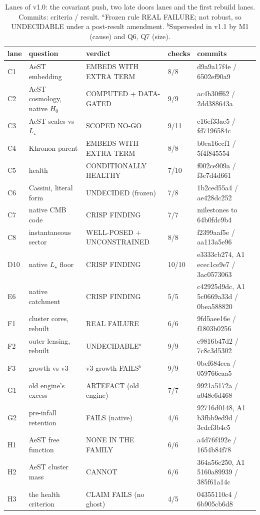 \documentclass[10pt]{article}
\begin{document}
\begin{table}[t]\centering\small
\caption{Lanes of v1.0: the covariant push, two late doors lanes and the first rebuild lanes. Commits: criteria / result. $^a$Frozen rule REAL FAILURE; not robust, so UNDECIDABLE under a post-result amendment. $^b$Superseded in v1.1 by M1 (cause) and Q6, Q7 (size).}\label{tab:lanes}
\begin{tabular}{llllp{}}
\toprule
lane & question & verdict & checks & commits\\
\midrule
C1 & AeST embedding & EMBEDS WITH EXTRA TERM & 8/8 & d9a9a17f4e / 6502ef90a9\\
C2 & AeST cosmology, native $H_0$ & COMPUTED + DATA-GATED & 9/9 & ac4b30ff62 / 2dd388643a\\
C3 & AeST scales vs $L_\star$ & SCOPED NO-GO & 9/11 & c16ef33ae5 / fd7196584c\\
C4 & Khronon parent & EMBEDS WITH EXTRA TERM & 8/8 & b0ea16ecf1 / 5f4f845554\\
C5 & health & CONDITIONALLY HEALTHY & 7/10 & f002ce909a / f3e7d4d661\\
C6 & Cassini, literal form & UNDECIDED (frozen) & 7/8 & 1b2ced55a4 / ae428dc252\\
C7 & native CMB code & CRISP FINDING & 7/7 & milestones to 64b0fdc9b4\\
C8 & instantaneous sector & WELL-POSED + UNCONSTRAINED & 8/8 & f2399aaf5e / aa113a5e96\\
D10 & native $L_\star$ floor & CRISP FINDING & 10/10 & e3333cb274, A1 ecec1ce9e7 / 3ac0573063\\
E6 & native catchment & CRISP FINDING & 5/5 & c42925d9dc, A1 5c0669a33d / 0bea588820\\
\midrule
F1 & cluster cores, rebuilt & REAL FAILURE & 6/6 & 9fd5aee16e / f1803b0256\\
F2 & outer lensing, rebuilt & UNDECIDABLE$^a$ & 9/9 & e9816b47d2 / 7c8c3d5302\\
F3 & growth vs v3 & v3 growth FAILS$^b$ & 9/9 & 0bef684eea / 059766caa5\\
G1 & old engine's excess & ARTEFACT (old engine) & 7/7 & 9921a5172a / a048e6d468\\
G2 & pre-infall retention & FAILS (native) & 4/6 & 92716d0148, A1 b3fbb9ed9d / 3cdcf3b4c5\\
H1 & AeST free function & NONE IN THE FAMILY & 6/6 & a4d76f492e / 1654b84f78\\
H2 & AeST cluster mass & CANNOT & 6/6 & 364a56c250, A1 5160a89939 / 385f61a14c\\
H3 & the health criterion & CLAIM FAILS (no ghost) & 4/5 & 04355110c4 / 6b905cb6d8\\
\bottomrule
\end{tabular}
\end{table}
\end{document}
